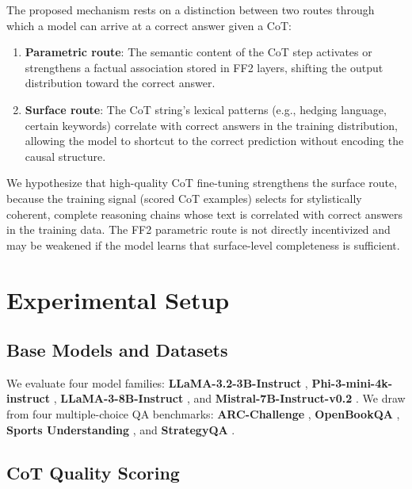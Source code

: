 \documentclass[11pt]{article}
\begin{document}
The proposed mechanism rests on a distinction between two routes through
which a model can arrive at a correct answer given a CoT:
\begin{enumerate}
  \item \textbf{Parametric route}: The semantic content of the CoT step
        activates or strengthens a factual association stored in FF2 layers,
        shifting the output distribution toward the correct answer.
  \item \textbf{Surface route}: The CoT string's lexical patterns (e.g.,
        hedging language, certain keywords) correlate with correct answers
        in the training distribution, allowing the model to shortcut to the
        correct prediction without encoding the causal structure.
\end{enumerate}
We hypothesize that high-quality CoT fine-tuning strengthens the surface
route, because the training signal (scored CoT examples) selects for
stylistically coherent, complete reasoning chains whose text is correlated
with correct answers in the training data. The FF2 parametric route is not
directly incentivized and may be weakened if the model learns that
surface-level completeness is sufficient.

\section{Experimental Setup}
\label{sec:setup}

\subsection{Base Models and Datasets}

We evaluate four model families: \textbf{LLaMA-3.2-3B-Instruct}
\citep{dubey2024llama3}, \textbf{Phi-3-mini-4k-instruct}
\citep{abdin2024phi3}, \textbf{LLaMA-3-8B-Instruct} \citep{dubey2024llama3},
and \textbf{Mistral-7B-Instruct-v0.2} \citep{jiang2023mistral}. We draw from four multiple-choice QA benchmarks:
\textbf{ARC-Challenge} \citep{clark2018arc}, \textbf{OpenBookQA}
\citep{mihaylov2018openbook}, \textbf{Sports Understanding}
\citep{srivastava2022bigbench}, and \textbf{StrategyQA}
\citep{geva2021strategyqa}.

\subsection{CoT Quality Scoring}
\end{document}
